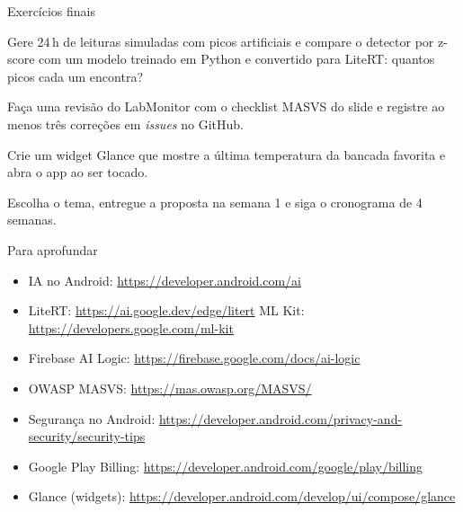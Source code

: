\documentclass[aspectratio=169,10pt]{beamer}
\begin{document}
\begin{frame}{Exercícios finais}
  \begin{exercicio}[Exercício 1 --- IA]
    Gere 24\,h de leituras simuladas com picos artificiais e compare o detector por z-score com um modelo treinado em Python e convertido para LiteRT: quantos picos cada um encontra?
  \end{exercicio}
  \begin{exercicio}
    Faça uma revisão do LabMonitor com o checklist MASVS do slide e registre ao menos três correções em \emph{issues} no GitHub.
  \end{exercicio}
  \begin{exercicio}
    Crie um widget Glance que mostre a última temperatura da bancada favorita e abra o app ao ser tocado.
  \end{exercicio}
  \begin{projeto}
    Escolha o tema, entregue a proposta na semana 1 e siga o cronograma de 4 semanas.
  \end{projeto}
\end{frame}

\begin{frame}{Para aprofundar}
  \small
  \begin{itemize}
    \item IA no Android: \url{https://developer.android.com/ai}
    \item LiteRT: \url{https://ai.google.dev/edge/litert} \quad ML Kit: \url{https://developers.google.com/ml-kit}
    \item Firebase AI Logic: \url{https://firebase.google.com/docs/ai-logic}
    \item OWASP MASVS: \url{https://mas.owasp.org/MASVS/}
    \item Segurança no Android: \url{https://developer.android.com/privacy-and-security/security-tips}
    \item Google Play Billing: \url{https://developer.android.com/google/play/billing}
    \item Glance (widgets): \url{https://developer.android.com/develop/ui/compose/glance}
  \end{itemize}
\end{frame}
\end{document}
